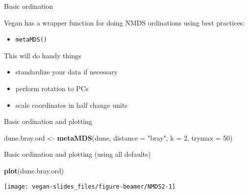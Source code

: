 \documentclass[10pt,ignorenonframetext,compress, aspectratio=169]{beamer}
\newenvironment{Shaded}{\begin{snugshade}}{\end{snugshade}}
\newcommand{\KeywordTok}[1]{\textcolor[rgb]{0.13,0.29,0.53}{\textbf{{#1}}}}
\newcommand{\DataTypeTok}[1]{\textcolor[rgb]{0.13,0.29,0.53}{{#1}}}
\newcommand{\DecValTok}[1]{\textcolor[rgb]{0.00,0.00,0.81}{{#1}}}
\newcommand{\StringTok}[1]{\textcolor[rgb]{0.31,0.60,0.02}{{#1}}}
\newcommand{\NormalTok}[1]{{#1}}
\begin{document}
\begin{frame}{Basic ordination}

Vegan has a wrapper function for doing NMDS ordinations using best
practices:

\begin{itemize}
\itemsep1pt\parskip0pt
\item
  \texttt{metaMDS()}
\end{itemize}

This will do handy things

\begin{itemize}
\itemsep1pt\parskip0pt
\item
  standardize your data if necessary
\item
  perform rotation to PCs
\item
  scale coordinates in half change units
\end{itemize}

\end{frame}

\begin{frame}[fragile]{Basic ordination and plotting}

\begin{Shaded}
\begin{Highlighting}[]
\NormalTok{dune.bray.ord <-}\StringTok{ }\KeywordTok{metaMDS}\NormalTok{(dune, }\DataTypeTok{distance =} \StringTok{"bray"}\NormalTok{, }\DataTypeTok{k =} \DecValTok{2}\NormalTok{, }\DataTypeTok{trymax =} \DecValTok{50}\NormalTok{)}
\end{Highlighting}
\end{Shaded}

\end{frame}

\begin{frame}[fragile]{Basic ordination and plotting (using all
defaults)}

\begin{Shaded}
\begin{Highlighting}[]
\KeywordTok{plot}\NormalTok{(dune.bray.ord)}
\end{Highlighting}
\end{Shaded}

\begin{center}\texttt{[image: vegan-slides\_files/figure-beamer/NMDS2-1]} \end{center}

\end{frame}
\end{document}
